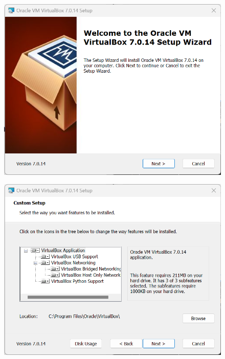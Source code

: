 \documentclass[12pt,a4paper]{article}
\begin{document}
\begin{figure}[H]
    \centering
    \includegraphics[width=1\linewidth]{M3_Virtualización_y_Contenedores/Tarea_2_Máquina_Virtual_Local/reporte/figuras/2-1_Instalación_Oracle_VM.png}
    \label{fig:Instalación_VirtualBox_1}
\end{figure}


\begin{figure}[H]
    \centering
    \includegraphics[width=1\linewidth]{M3_Virtualización_y_Contenedores/Tarea_2_Máquina_Virtual_Local/reporte/figuras/2-2_Instalación_Oracle_VM.png}
    \label{fig:Instalación_VirtualBox_2}
\end{figure}
\end{document}
